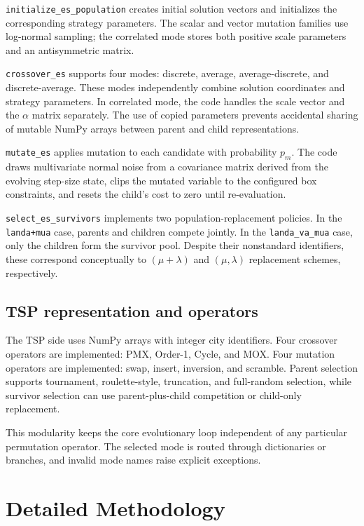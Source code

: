 \documentclass[11pt,a4paper]{article}
\newcommand{\code}[1]{\texttt{#1}}
\begin{document}
\code{initialize\_es\_population} creates initial solution vectors and initializes the corresponding strategy parameters. The scalar and vector mutation families use log-normal sampling; the correlated mode stores both positive scale parameters and an antisymmetric matrix.

\code{crossover\_es} supports four modes: discrete, average, average-discrete, and discrete-average. These modes independently combine solution coordinates and strategy parameters. In correlated mode, the code handles the scale vector and the $\alpha$ matrix separately. The use of copied parameters prevents accidental sharing of mutable NumPy arrays between parent and child representations.

\code{mutate\_es} applies mutation to each candidate with probability $p_m$. The code draws multivariate normal noise from a covariance matrix derived from the evolving step-size state, clips the mutated variable to the configured box constraints, and resets the child's cost to zero until re-evaluation.

\code{select\_es\_survivors} implements two population-replacement policies. In the \code{landa+mua} case, parents and children compete jointly. In the \code{landa\_va\_mua} case, only the children form the survivor pool. Despite their nonstandard identifiers, these correspond conceptually to $(\mu+\lambda)$ and $(\mu,\lambda)$ replacement schemes, respectively.

\subsection{TSP representation and operators}
The TSP side uses NumPy arrays with integer city identifiers. Four crossover operators are implemented: PMX, Order-1, Cycle, and MOX. Four mutation operators are implemented: swap, insert, inversion, and scramble. Parent selection supports tournament, roulette-style, truncation, and full-random selection, while survivor selection can use parent-plus-child competition or child-only replacement.

This modularity keeps the core evolutionary loop independent of any particular permutation operator. The selected mode is routed through dictionaries or branches, and invalid mode names raise explicit exceptions.

\section{Detailed Methodology}
\end{document}
